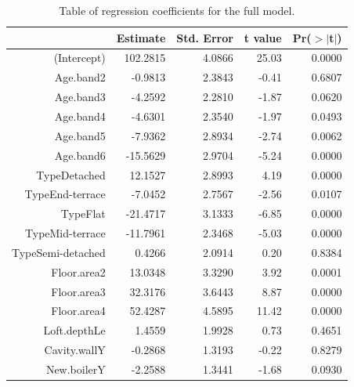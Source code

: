 \documentclass[9pt]{extarticle}
\begin{document}
\begin{table}[ht]
\centering
\begin{tabular}{rrrrr}
  \hline
 & Estimate & Std. Error & t value & Pr($>$$|$t$|$) \\ 
  \hline
(Intercept) & 102.2815 & 4.0866 & 25.03 & 0.0000 \\ 
  Age.band2 & -0.9813 & 2.3843 & -0.41 & 0.6807 \\ 
  Age.band3 & -4.2592 & 2.2810 & -1.87 & 0.0620 \\ 
  Age.band4 & -4.6301 & 2.3540 & -1.97 & 0.0493 \\ 
  Age.band5 & -7.9362 & 2.8934 & -2.74 & 0.0062 \\ 
  Age.band6 & -15.5629 & 2.9704 & -5.24 & 0.0000 \\ 
  TypeDetached & 12.1527 & 2.8993 & 4.19 & 0.0000 \\ 
  TypeEnd-terrace & -7.0452 & 2.7567 & -2.56 & 0.0107 \\ 
  TypeFlat & -21.4717 & 3.1333 & -6.85 & 0.0000 \\ 
  TypeMid-terrace & -11.7961 & 2.3468 & -5.03 & 0.0000 \\ 
  TypeSemi-detached & 0.4266 & 2.0914 & 0.20 & 0.8384 \\ 
  Floor.area2 & 13.0348 & 3.3290 & 3.92 & 0.0001 \\ 
  Floor.area3 & 32.3176 & 3.6443 & 8.87 & 0.0000 \\ 
  Floor.area4 & 52.4287 & 4.5895 & 11.42 & 0.0000 \\ 
  Loft.depthLe & 1.4559 & 1.9928 & 0.73 & 0.4651 \\ 
  Cavity.wallY & -0.2868 & 1.3193 & -0.22 & 0.8279 \\ 
  New.boilerY & -2.2588 & 1.3441 & -1.68 & 0.0930 \\ 
   \hline
\end{tabular}
\caption{Table of regression coefficients for the full model.}
\label{tab:fulmo}
\end{table}
\end{document}
